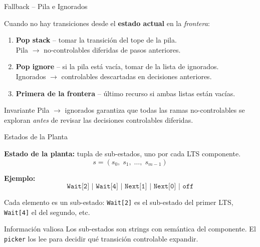 \documentclass{beamer}
\begin{document}
\begin{frame}{Fallback -- Pila e Ignorados}

Cuando no hay transiciones desde el \textbf{estado actual} en la \emph{frontera}:

\bigskip
\begin{enumerate}
  \item[\textcolor{cStack}{\textbf{1.}}] \textcolor{cStack}{\textbf{Pop stack}} -- tomar la transici\'on del tope de la pila.\\
    {\small Pila $\to$ no-controlables diferidas de pasos anteriores.}

  \bigskip
  \item[\textcolor{cIgnore}{\textbf{2.}}] \textcolor{cIgnore}{\textbf{Pop ignore}} -- si la pila est\'a vac\'ia, tomar de la lista de ignorados.\\
    {\small Ignorados $\to$ controlables descartadas en decisiones anteriores.}

  \bigskip
  \item[\textbf{3.}] \textbf{Primera de la frontera} -- \'ultimo recurso si ambas listas est\'an vac\'ias.
\end{enumerate}

\bigskip
\begin{alertblock}{Invariante}
Pila $\to$ ignorados garantiza que todas las ramas no-controlables se exploran \emph{antes} de revisar las decisiones controlables diferidas.
\end{alertblock}
\end{frame}

\begin{frame}{Estados de la Planta}

\textbf{Estado de la planta:} tupla de sub-estados, uno por cada LTS componente.
\[
  s = (s_0,\; s_1,\; \ldots,\; s_{m-1})
\]

\bigskip
\textbf{Ejemplo:}
\[
  \texttt{Wait[2] | Wait[4] | Next[1] | Next[0] | off}
\]

\medskip
Cada elemento es un sub-estado: \texttt{Wait[2]} es el sub-estado del primer LTS, \texttt{Wait[4]} el del segundo, etc.

\bigskip
\begin{alertblock}{Información valiosa}
Los sub-estados son strings con semántica del componente. El \texttt{picker} los lee para decidir qué transición controlable expandir.
\end{alertblock}

\end{frame}
\end{document}
